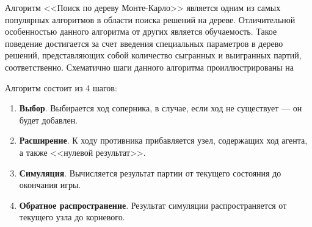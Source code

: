 Алгоритм <<Поиск по дереву Монте-Карло>> является одним из самых популярных алгоритмов в области поиска решений на дереве. Отличительной особенностью данного алгоритма от других является обучаемость. Такое поведение достигается за счет введения специальных параметров в дерево решений, представляющих собой количество сыгранных и выигранных партий, соответственно. Схематично шаги данного алгоритма проиллюстрированы на 


Алгоритм состоит из 4 шагов:
\begin{enumerate}
    \item \textbf{Выбор}. Выбирается ход соперника, в случае, если ход не существует --- он будет добавлен.
    \item \textbf{Расширение}. К ходу противника прибавляется узел, содержащих ход агента, а также <<нулевой результат>>.
    \item \textbf{Симуляция}. Вычисляется результат партии от текущего состояния до окончания игры.
    \item \textbf{Обратное распространение}. Результат симуляции распространяется от текущего узла до корневого.
\end{enumerate}

